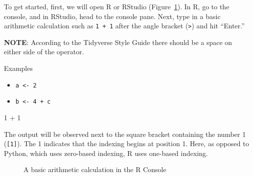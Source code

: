 \documentclass[
  letterpaper,
  DIV=11,
  numbers=noendperiod]{scrreprt}
\newenvironment{Shaded}{}{}
\newcommand{\DecValTok}[1]{\textcolor[rgb]{0.00,0.36,0.77}{#1}}
\newcommand{\SpecialCharTok}[1]{\textcolor[rgb]{0.00,0.36,0.77}{#1}}
\providecommand{\tightlist}{%
  \setlength{\itemsep}{0pt}\setlength{\parskip}{0pt}}\usepackage{longtable,booktabs,array}
\begin{document}
To get started, first, we will open R or RStudio
(Figure~\ref{fig-arithmetic-1}). In R, go to the console, and in
RStudio, head to the console pane. Next, type in a basic arithmetic
calculation such as \texttt{1\ +\ 1} after the angle bracket
(\texttt{\textgreater{}}) and hit ``Enter.''

\textbf{NOTE}: According to the Tidyverse Style Guide there should be a
space on either side of the operator.

Examples

\begin{itemize}
\tightlist
\item
  \texttt{a\ \textless{}-\ 2}
\item
  \texttt{b\ \textless{}-\ 4\ +\ c}
\end{itemize}

\begin{Shaded}
\begin{Highlighting}[]
\DecValTok{1} \SpecialCharTok{+} \DecValTok{1}
\end{Highlighting}
\end{Shaded}

The output will be observed next to the square bracket containing the
number 1 (\texttt{{[}1{]}}). The 1 indicates that the indexing begins at
position 1. Here, as opposed to Python, which uses zero-based indexing,
R uses one-based indexing.

\begin{figure}


\caption{\label{fig-arithmetic-1}A basic arithmetic calculation in the R
Console}

\end{figure}%
\end{document}
